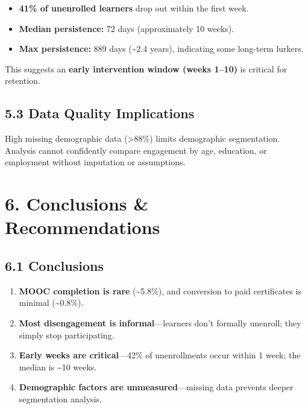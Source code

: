 \documentclass[
]{article}
\providecommand{\tightlist}{%
  \setlength{\itemsep}{0pt}\setlength{\parskip}{0pt}}
\begin{document}
\begin{itemize}
\tightlist
\item
  \textbf{41\% of unenrolled learners} drop out within the first week.\\
\item
  \textbf{Median persistence:} 72 days (approximately 10 weeks).\\
\item
  \textbf{Max persistence:} 889 days (\textasciitilde2.4 years),
  indicating some long-term lurkers.
\end{itemize}

This suggests an \textbf{early intervention window (weeks 1--10)} is
critical for retention.

\subsection{5.3 Data Quality
Implications}\label{data-quality-implications}

High missing demographic data (\textgreater88\%) limits demographic
segmentation. Analysis cannot confidently compare engagement by age,
education, or employment without imputation or assumptions.

\section{6. Conclusions \&
Recommendations}\label{conclusions-recommendations}

\subsection{6.1 Conclusions}\label{conclusions}

\begin{enumerate}
\def\labelenumi{\arabic{enumi}.}
\tightlist
\item
  \textbf{MOOC completion is rare} (\textasciitilde5.8\%), and
  conversion to paid certificates is minimal (\textasciitilde0.8\%).\\
\item
  \textbf{Most disengagement is informal}---learners don't formally
  unenroll; they simply stop participating.\\
\item
  \textbf{Early weeks are critical}---42\% of unenrollments occur within
  1 week; the median is \textasciitilde10 weeks.\\
\item
  \textbf{Demographic factors are unmeasured}---missing data prevents
  deeper segmentation analysis.
\end{enumerate}
\end{document}
